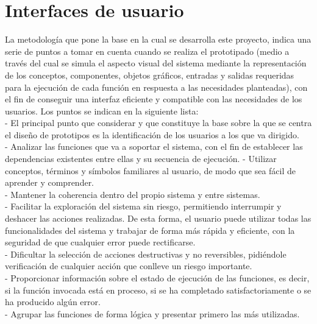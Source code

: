 \section{Interfaces de usuario} 
\noindent La metodología que pone la base en la cual se desarrolla este proyecto, indica una serie de puntos a tomar en cuenta cuando se realiza el prototipado (medio a través del cual se simula el aspecto visual del sistema mediante la representación de los conceptos, componentes, objetos gráficos, entradas y salidas requeridas para la ejecución de cada función en respuesta a las necesidades planteadas), con el fin de conseguir una interfaz eficiente y compatible con las necesidades de los usuarios. Los puntos se indican en la siguiente lista:\\

-	El principal punto que considerar y que constituye la base sobre la que se centra el diseño de prototipos es la identificación de los usuarios a los que va dirigido.\\

-	Analizar las funciones que va a soportar el sistema, con el fin de establecer las dependencias existentes entre ellas y su secuencia de ejecución.
-	Utilizar conceptos, términos y símbolos familiares al usuario, de modo que sea fácil de aprender y comprender.\\

-	Mantener la coherencia dentro del propio sistema y entre sistemas.\\

-	Facilitar la exploración del sistema sin riesgo, permitiendo interrumpir y deshacer las acciones realizadas. De esta forma, el usuario puede utilizar todas las funcionalidades del sistema y trabajar de forma más rápida y eficiente, con la seguridad de que cualquier error puede rectificarse.\\

-	Dificultar la selección de acciones destructivas y no reversibles, pidiéndole verificación de cualquier acción que conlleve un riesgo importante.\\

-	Proporcionar información sobre el estado de ejecución de las funciones, es decir, si la función invocada está en proceso, si se ha completado satisfactoriamente o se ha producido algún error.\\

-	Agrupar las funciones de forma lógica y presentar primero las más utilizadas.\\

